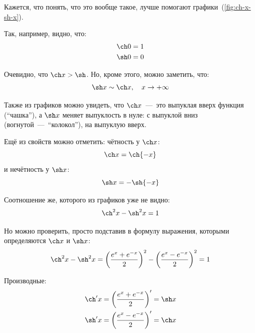 \documentclass[a4paper,12pt]{article}
\begin{document}
\begin{remark}
    Кажется, что понять, что это вообще такое, лучше помогают графики~(\ref{fig:ch-x-sh-x}).

    Так, например, видно, что:
    \[
      \begin{aligned}
        &\ch 0 = 1\\
        &\sh 0 = 0
      \end{aligned}
    \]

    Очевидно, что $\ch x \hm> \sh$.
    Но, кроме этого, можно заметить, что:
    \[
      \sh x \sim \ch x,\quad x \to +\infty
    \]

    Также из графиков можно увидеть, что $\ch x$~---~это выпуклая вверх функция (``чашка''), а $\sh x$ меняет выпуклость в нуле: с выпуклой вниз (вогнутой~---~``колокол''), на выпуклую вверх.

    Ещё из свойств можно отметить: чётность у $\ch x$:
    \[
      \ch x = \ch{-x}
    \]
    и нечётность у $\sh x$:
    \[
      \sh x = {-}\sh{-x}
    \]

    Соотношение же, которого из графиков уже не видно:
    \[
      \ch^2 x - \sh^2 x = 1
    \]

    Но можно проверить, просто подставив в формулу выражения, которыми определяются $\ch x$ и $\sh x$:
    \[
      \ch^2 x - \sh^2 x = 
        \left(\frac{e^x + e^{-x}}{2}\right)^2 - \left(\frac{e^x - e^{-x}}{2}\right)^2 = 1
    \]

    Производные:
    \[
      \begin{aligned}
        &\ch'x = \left(\frac{e^x + e^{-x}}{2}\right)' = \sh x\\
        &\sh'x = \left(\frac{e^x - e^{-x}}{2}\right)' = \ch x
      \end{aligned}
    \]
  \end{remark}
  
\end{document}
